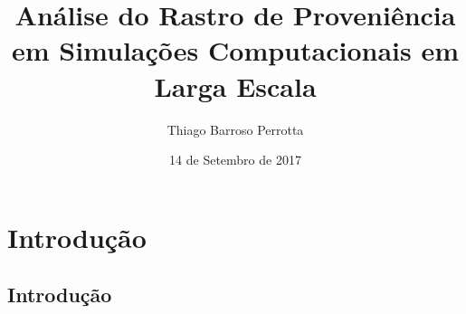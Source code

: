 \documentclass[12pt,compress,final]{beamer}
\title[Análise do Rastro de Proveniência]{Análise do Rastro de Proveniência em Simulações Computacionais em Larga Escala} %
\author[Thiago B. Perrotta]{Thiago Barroso Perrotta} %
\institute[UFRJ] %
{
Engenharia de Computação e Informação \\ \smallskip
Escola Politécnica --- Universidade Federal do Rio de Janeiro \\ %
\medskip
\href{mailto:perrotta.thiago@poli.ufrj.br}{\nolinkurl{perrotta.thiago@poli.ufrj.br}} %
}
\date{14 de Setembro de 2017} %
\makeatletter
\newenvironment{withoutheadline}{
        \setbeamertemplate{headline}[default]
        \def\beamer@entrycode{\vspace*{-\headheight}}
    }{}
\makeatother
\begin{document}
{
\begin{frame}
  \titlepage{}
\end{frame}
\addtocounter{page}{-1}
}




\section{Introdução}
\subsection*{Introdução}
\end{document}

